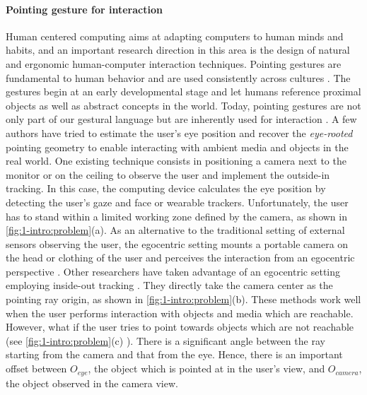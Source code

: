 \paragraph{Pointing gesture for interaction}
Human centered computing aims at adapting computers to human minds and habits, and an important research direction in this area is the design of natural and ergonomic human-computer interaction techniques.
Pointing gestures are fundamental to human behavior \cite{Matthews2012} and are used consistently across cultures  \cite{McNeill2000}. The gestures begin at an early developmental stage \cite{Carpendale2010} and let humans reference proximal objects as well as abstract concepts in the world. Today, pointing gestures are not only part of our gestural language but are inherently used for interaction \cite{Nanayakkara2013a}.
A few authors have tried to estimate the user's eye position and recover the \textit{eye-rooted} pointing geometry to enable interacting with ambient media and objects in the real world. One existing technique consists in positioning a camera next to the monitor or on the ceiling to observe the user and implement the outside-in tracking. In this case, the computing device calculates the eye position by detecting the user's gaze and face or wearable trackers. Unfortunately, the user has to stand within a limited working zone defined by the camera, as shown in \figurename{\ref{fig:1-intro:problem}(a)}.
As an alternative to the traditional setting of external sensors observing the user, the egocentric setting mounts a portable camera on the head or clothing of the user and perceives the interaction from an egocentric perspective \cite{Fathi2011,Li2015}. 
Other researchers have taken advantage of an egocentric setting employing inside-out tracking \cite{Harrison2011,Mistry2009}. 
They directly take the camera center as the pointing ray origin, as shown in \figurename{\ref{fig:1-intro:problem}(b)}. These methods work well when the user performs interaction with objects and media which are reachable.
However, what if the user tries to point towards objects which are not reachable (see \figurename{\ref{fig:1-intro:problem}(c)} ). There is a significant angle between the ray starting from the camera and that from the eye. Hence, there is an important offset between $O_{eye}$, the object which is pointed at in the user's view, and $O_{camera}$, the object observed in the camera view.
